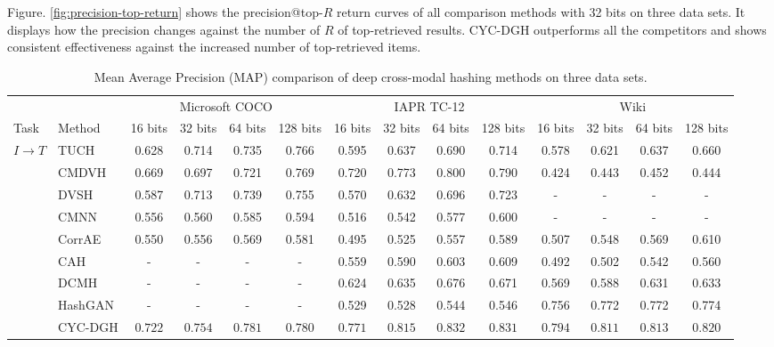 \documentclass[10pt,journal,twocolumn]{IEEEtran}
\begin{document}
Figure. \ref{fig:precision-top-return} shows the precision@top-$R$ return curves of all comparison methods with 32 bits on three data sets. It displays how the precision changes against the number of $R$ of top-retrieved results. CYC-DGH outperforms all the competitors and shows consistent effectiveness against the increased number of top-retrieved items.


\begin{table*}[hbt]
  \centering
  \caption{Mean Average Precision (MAP) comparison of deep cross-modal hashing methods on three data sets.}\label{tab:MAP-values}{
  \begin{tabular}{l|l|c|c|c|c|c|c|c|c|c|c|c|c}
  \hline
  & & \multicolumn{4}{c|}{Microsoft COCO} & \multicolumn{4}{c|}{IAPR TC-12} & \multicolumn{4}{c}{Wiki}\\
  \cline{3-14}
   Task & Method & 16 bits & 32 bits & 64 bits & 128 bits & 16 bits & 32 bits & 64 bits & 128 bits & 16 bits & 32 bits & 64 bits & 128 bits \\
  \hline
   \multirow{9}{*}{$I \rightarrow T$} & TUCH \cite{TUCH} & 0.628 & 0.714 & 0.735 & 0.766 & 0.595 & 0.637 & 0.690 & 0.714 & 0.578 & 0.621 & 0.637 & 0.660 \\
   & CMDVH \cite{CMDVH} & 0.669 & 0.697 & 0.721 & 0.769 & 0.720 & 0.773 & 0.800 & 0.790 & 0.424 & 0.443 & 0.452 & 0.444\\
   & DVSH \cite{DVSH} & 0.587 & 0.713 & 0.739 & 0.755 & 0.570 & 0.632 & 0.696 & 0.723 & - & - & - & - \\
   & CMNN \cite{Multimodal-hashing} & 0.556 & 0.560 & 0.585 & 0.594 & 0.516 & 0.542 & 0.577 & 0.600 & - & - & - & - \\
   & CorrAE \cite{Corr-AE} & 0.550 & 0.556 & 0.569 & 0.581 & 0.495 & 0.525 & 0.557 & 0.589 & 0.507 & 0.548 & 0.569 & 0.610 \\
   & CAH \cite{CAH} & - & - & - & - & 0.559 & 0.590 & 0.603 & 0.609 & 0.492 & 0.502 & 0.542 & 0.560 \\
   & DCMH \cite{DCMH} & - & - & - & - & 0.624 & 0.635 & 0.676 & 0.671 & 0.569 & 0.588 & 0.631 & 0.633 \\
   & HashGAN \cite{HashGAN} & - & - & - & - & 0.529 & 0.528 & 0.544 & 0.546 & 0.756 & 0.772 & 0.772 & 0.774 \\
   & CYC-DGH & \color{red}$\mathbf{0.722}$ & \color{red}$\mathbf{0.754}$ & \color{red}$\mathbf{0.781}$ & \color{red}$\mathbf{0.780}$ & \color{red}$\mathbf{0.771}$ & \color{red}$\mathbf{0.815}$ & \color{red}$\mathbf{0.832}$ & \color{red}$\mathbf{0.831}$ & \color{red}$\mathbf{0.794}$ & \color{red}$\mathbf{0.811}$ & \color{red}$\mathbf{0.813}$ & \color{red}$\mathbf{0.820}$ \\

\end{tabular}}
\end{table*}
\end{document}
